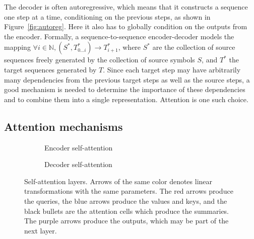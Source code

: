 \documentclass[11pt,twocolumn]{article}
\begin{document}
The decoder is often autoregressive,
which means that it constructs a sequence one step at a time,
conditioning on the previous steps,
as shown in Figure~\ref{fig:autoreg}.
Here it also has to globally condition on the outputs from the encoder.
Formally, a sequence-to-sequence encoder-decoder models the mapping
\(\forall i \in \mathbb{N}, \left(S^{\ast}, T^{\ast}_{0 \ldots i}\right) \to T^{\ast}_{i+1}\),
where \(S^{\ast}\) are the collection of source sequences freely generated by the collection of source symbols \(S\),
and \(T^{\ast}\) the target sequences generated by \(T\).
Since each target step may have arbitrarily many dependencies from the previous target steps
as well as the source steps,
a good mechanism is needed to determine the importance of these dependencies
and to combine them into a single representation.
Attention is one such choice.

\subsection{Attention mechanisms}

\begin{figure}
  \begin{subfigure}{0.5\textwidth}
    \centering
    \caption*{Encoder self-attention}
  \end{subfigure}%
  \begin{subfigure}{0.5\textwidth}
    \centering
    \caption*{Decoder self-attention}
  \end{subfigure}
  \caption[]{\label{fig:layer}Self-attention layers.
    Arrows of the same color denotes linear transformations with the same parameters.
    The red arrows produce the queries,
    the blue arrows produce the values and keys,
    and the black bullets are the attention cells
    which produce the summaries.
    The purple arrows produce the outputs,
    which may be part of the next layer.}
\end{figure}
\end{document}
